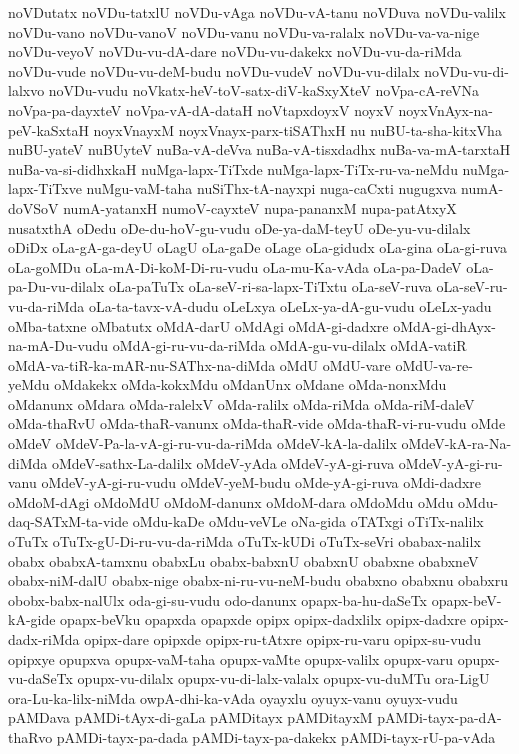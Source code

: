 {noVDutatx
noVDu-tatxlU
noVDu-vAga
noVDu-vA-tanu
noVDuva
noVDu-valilx
noVDu-vano
noVDu-vanoV
noVDu-vanu
noVDu-va-ralalx
noVDu-va-va-nige
noVDu-veyoV
noVDu-vu-dA-dare
noVDu-vu-dakekx
noVDu-vu-da-riMda
noVDu-vude
noVDu-vu-deM-budu
noVDu-vudeV
noVDu-vu-dilalx
noVDu-vu-di-lalxvo
noVDu-vudu
noVkatx-heV-toV-satx-diV-kaSxyXteV
noVpa-cA-reVNa
noVpa-pa-dayxteV
noVpa-vA-dA-dataH
noVtapxdoyxV
noyxV
noyxVnAyx-na-peV-kaSxtaH
noyxVnayxM
noyxVnayx-parx-tiSAThxH
nu
nuBU-ta-sha-kitxVha
nuBU-yateV
nuBUyteV
nuBa-vA-deVva
nuBa-vA-tisxdadhx
nuBa-va-mA-tarxtaH
nuBa-va-si-didhxkaH
nuMga-lapx-TiTxde
nuMga-lapx-TiTx-ru-va-neMdu
nuMga-lapx-TiTxve
nuMgu-vaM-taha
nuSiThx-tA-nayxpi
nuga-caCxti
nugugxva
numA-doVSoV
numA-yatanxH
numoV-cayxteV
nupa-pananxM
nupa-patAtxyX
nusatxthA
oDedu
oDe-du-hoV-gu-vudu
oDe-ya-daM-teyU
oDe-yu-vu-dilalx
oDiDx
oLa-gA-ga-deyU
oLagU
oLa-gaDe
oLage
oLa-gidudx
oLa-gina
oLa-gi-ruva
oLa-goMDu
oLa-mA-Di-koM-Di-ru-vudu
oLa-mu-Ka-vAda
oLa-pa-DadeV
oLa-pa-Du-vu-dilalx
oLa-paTuTx
oLa-seV-ri-sa-lapx-TiTxtu
oLa-seV-ruva
oLa-seV-ru-vu-da-riMda
oLa-ta-tavx-vA-dudu
oLeLxya
oLeLx-ya-dA-gu-vudu
oLeLx-yadu
oMba-tatxne
oMbatutx
oMdA-darU
oMdAgi
oMdA-gi-dadxre
oMdA-gi-dhAyx-na-mA-Du-vudu
oMdA-gi-ru-vu-da-riMda
oMdA-gu-vu-dilalx
oMdA-vatiR
oMdA-va-tiR-ka-mAR-nu-SAThx-na-diMda
oMdU
oMdU-vare
oMdU-va-re-yeMdu
oMdakekx
oMda-kokxMdu
oMdanUnx
oMdane
oMda-nonxMdu
oMdanunx
oMdara
oMda-ralelxV
oMda-ralilx
oMda-riMda
oMda-riM-daleV
oMda-thaRvU
oMda-thaR-vanunx
oMda-thaR-vide
oMda-thaR-vi-ru-vudu
oMde
oMdeV
oMdeV-Pa-la-vA-gi-ru-vu-da-riMda
oMdeV-kA-la-dalilx
oMdeV-kA-ra-Na-diMda
oMdeV-sathx-La-dalilx
oMdeV-yAda
oMdeV-yA-gi-ruva
oMdeV-yA-gi-ru-vanu
oMdeV-yA-gi-ru-vudu
oMdeV-yeM-budu
oMde-yA-gi-ruva
oMdi-dadxre
oMdoM-dAgi
oMdoMdU
oMdoM-danunx
oMdoM-dara
oMdoMdu
oMdu
oMdu-daq-SATxM-ta-vide
oMdu-kaDe
oMdu-veVLe
oNa-gida
oTATxgi
oTiTx-nalilx
oTuTx
oTuTx-gU-Di-ru-vu-da-riMda
oTuTx-kUDi
oTuTx-seVri
obabax-nalilx
obabx
obabxA-tamxnu
obabxLu
obabx-babxnU
obabxnU
obabxne
obabxneV
obabx-niM-dalU
obabx-nige
obabx-ni-ru-vu-neM-budu
obabxno
obabxnu
obabxru
obobx-babx-nalUlx
oda-gi-su-vudu
odo-danunx
opapx-ba-hu-daSeTx
opapx-beV-kA-gide
opapx-beVku
opapxda
opapxde
opipx
opipx-dadxlilx
opipx-dadxre
opipx-dadx-riMda
opipx-dare
opipxde
opipx-ru-tAtxre
opipx-ru-varu
opipx-su-vudu
opipxye
opupxva
opupx-vaM-taha
opupx-vaMte
opupx-valilx
opupx-varu
opupx-vu-daSeTx
opupx-vu-dilalx
opupx-vu-di-lalx-valalx
opupx-vu-duMTu
ora-LigU
ora-Lu-ka-lilx-niMda
owpA-dhi-ka-vAda
oyayxlu
oyuyx-vanu
oyuyx-vudu
pAMDava
pAMDi-tAyx-di-gaLa
pAMDitayx
pAMDitayxM
pAMDi-tayx-pa-dA-thaRvo
pAMDi-tayx-pa-dada
pAMDi-tayx-pa-dakekx
pAMDi-tayx-rU-pa-vAda
}
